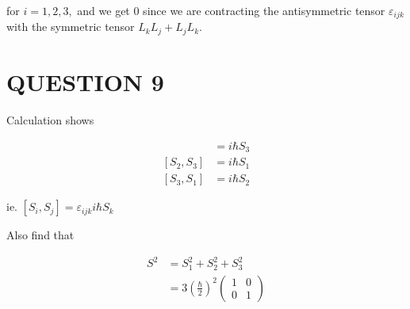 \documentclass[a4paper]{article}
\begin{document}
for $ i = 1,2,3, $ and we get 0 since we are contracting the antisymmetric tensor $ \varepsilon_{ijk} $ with the symmetric tensor $ L_{k}L_{j} + L_{j}L_{k} $.

\section{QUESTION 9}

Calculation shows

\begin{align*}
[S_{1},S_{2}]& = i \hbar S_{3} \\ 
[S_{2},S_{3}]& = i \hbar S_{1} \\ 
[S_{3},S_{1}]& = i \hbar S_{2}
\end{align*}

ie. $ [S_{i},S_{j}] = \varepsilon_{ijk} i\hbar S_{k} $

Also find that

\begin{align*}
S^{2} & = S_{1}^{2}  + S_{2}^{2} + S_{3}^{2} \\
& = 3 \left( \frac{ \hbar}{2}  \right)^{2} \begin{pmatrix}
1 & 0 \\
0 & 1
\end{pmatrix}
\end{align*}
\end{document}
